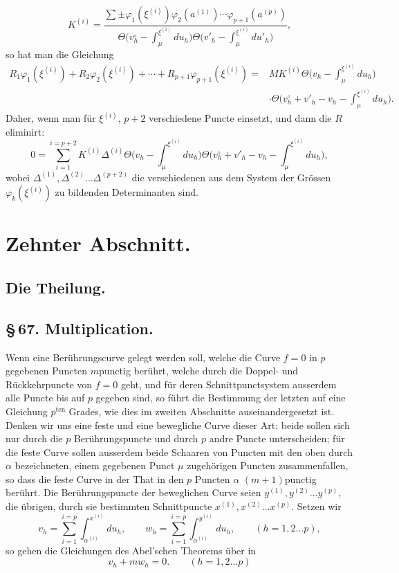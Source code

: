 \documentclass[10pt]{article}
\begin{document}
\[
K^{(i)}=\frac{\sum \pm \varphi_1(\xi^{(i)})\varphi_2(a^{(1)})\cdots\varphi_{p+1}(a^{(p)})}
{\Theta\!\bigl(v_h^\circ-\int_{\mu}^{\xi^{(i)}}du_h\bigr)\Theta\!\bigl(v'_h-\int_{\mu}^{\xi^{(i)}}du'_h\bigr)},
\]
so hat man die Gleichung
\[
\begin{aligned}
R_1\varphi_1(\xi^{(i)})+R_2\varphi_2(\xi^{(i)})+\cdots+R_{p+1}\varphi_{p+1}(\xi^{(i)})
= {}& M K^{(i)}\Theta\!\biggl(v_h-\int_{\mu}^{\xi^{(i)}}du_h\biggr)\\
&\cdot\Theta\!\biggl(v_h^\circ+v'_h-v_h-\int_{\mu}^{\xi^{(i)}}du_h\biggr).
\end{aligned}
\]
Daher, wenn man für \(\xi^{(i)}\), \(p+2\) verschiedene Puncte einsetzt, und dann die \(R\) eliminirt:
\[
0=\sum_{i=1}^{i=p+2}K^{(i)}\Delta^{(i)}\Theta\!\biggl(v_h-\int_{\mu}^{\xi^{(i)}}du_h\biggr)\Theta\!\biggl(v_h^\circ+v'_h-v_h-\int_{\mu}^{\xi^{(i)}}du_h\biggr),
\]
wobei \(\Delta^{(1)},\Delta^{(2)}\ldots\Delta^{(p+2)}\) die verschiedenen aus dem System der Grössen \(\varphi_k(\xi^{(i)})\) zu bildenden Determinanten sind.
\clearpage

\section*{Zehnter Abschnitt.}
\subsection*{Die Theilung.}

\subsection*{\S\,67. Multiplication.}

Wenn eine Berührungscurve gelegt werden soll, welche die Curve \(f=0\) in \(p\) gegebenen Puncten \(m\)punctig berührt, welche durch die Doppel- und Rückkehrpuncte von \(f=0\) geht, und für deren Schnittpunctsystem ausserdem alle Puncte bis auf \(p\) gegeben sind, so führt die Bestimmung der letzten auf eine Gleichung \(p^{\text{ten}}\) Grades, wie dies im zweiten Abschnitte auseinandergesetzt ist. Denken wir uns eine feste und eine bewegliche Curve dieser Art; beide sollen sich nur durch die \(p\) Berührungspuncte und durch \(p\) andre Puncte unterscheiden; für die feste Curve sollen ausserdem beide Schaaren von Puncten mit den oben durch \(\alpha\) bezeichneten, einem gegebenen Punct \(\mu\) zugehörigen Puncten zusammenfallen, so dass die feste Curve in der That in den \(p\) Puncten \(\alpha\) \((m+1)\)punctig berührt. Die Berührungspuncte der beweglichen Curve seien \(y^{(1)},y^{(2)}\ldots y^{(p)}\), die übrigen, durch sie bestimmten Schnittpuncte \(x^{(1)},x^{(2)}\ldots x^{(p)}\). Setzen wir
\[
v_h=\sum_{i=1}^{i=p}\int_{\alpha^{(i)}}^{x^{(i)}}du_h,\qquad
w_h=\sum_{i=1}^{i=p}\int_{\alpha^{(i)}}^{y^{(i)}}du_h,\qquad
(h=1,2\ldots p),
\]
so gehen die Gleichungen des Abel'schen Theorems über in
\[
v_h+mw_h=0.\qquad(h=1,2\ldots p)
\]
\end{document}
